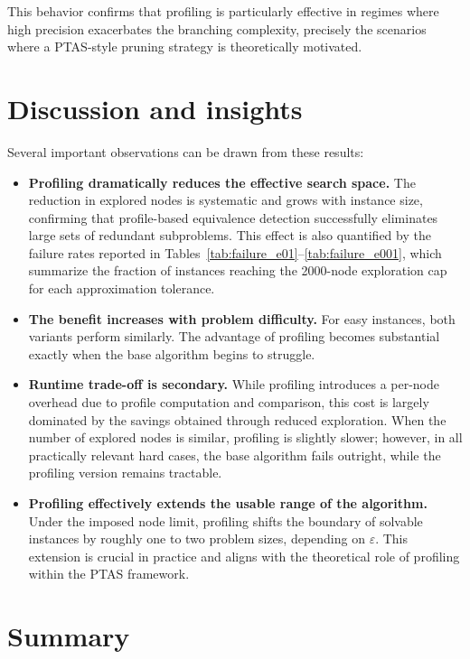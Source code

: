 This behavior confirms that profiling is particularly effective in regimes where high precision exacerbates the branching complexity, precisely the scenarios where a PTAS-style pruning strategy is theoretically motivated.

\section{Discussion and insights}

Several important observations can be drawn from these results:

\begin{itemize}
  \item \textbf{Profiling dramatically reduces the effective search space.}
  The reduction in explored nodes is systematic and grows with instance size, confirming that profile-based equivalence detection successfully eliminates large sets of redundant subproblems.
  This effect is also quantified by the failure rates reported in Tables~\ref{tab:failure_e01}--\ref{tab:failure_e001}, which summarize the fraction of instances reaching the 2000-node exploration cap for each approximation tolerance.
  \item \textbf{The benefit increases with problem difficulty.}
  For easy instances, both variants perform similarly.
  The advantage of profiling becomes substantial exactly when the base algorithm begins to struggle.
  \item \textbf{Runtime trade-off is secondary.}
  While profiling introduces a per-node overhead due to profile computation and comparison, this cost is largely dominated by the savings obtained through reduced exploration.
  When the number of explored nodes is similar, profiling is slightly slower; however, in all practically relevant hard cases, the base algorithm fails outright, while the profiling version remains tractable.
  \item \textbf{Profiling effectively extends the usable range of the algorithm.}
  Under the imposed node limit, profiling shifts the boundary of solvable instances by roughly one to two problem sizes, depending on \(\varepsilon\).
  This extension is crucial in practice and aligns with the theoretical role of profiling within the PTAS framework.
\end{itemize}

\section{Summary}

